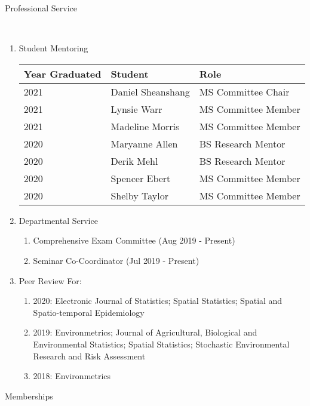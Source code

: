 \documentclass[12pt]{article}
\newcommand{\head}[1]{ %
    \bigskip %
    \begin{large}\begin{bf}{#1}\end{bf}\end{large} %

    \ \\ [-1.3cm] %

    \hrulefill}
\begin{document}
\head{Professional Service}
\begin{enumerate}[label=$\bullet$]

\item Student Mentoring

\begin{table}[H]
\centering
\begin{tabular}{lll}
  \hline
Year Graduated & Student & Role \\ 
  \hline
2021  & Daniel Sheanshang & MS Committee Chair  \\ 
2021  & Lynsie Warr & MS Committee Member  \\ 
2021  & Madeline Morris & MS Committee Member  \\ 
2020  & Maryanne Allen & BS Research Mentor  \\ 
2020  & Derik Mehl & BS Research Mentor \\ 
2020  & Spencer Ebert & MS Committee Member  \\ 
2020  & Shelby Taylor & MS Committee Member  \\ 
   \hline
\end{tabular}
\end{table}

\item Departmental Service
\begin{enumerate}[label=$\cdot$]
\item Comprehensive Exam Committee (Aug 2019 - Present)
\item Seminar Co-Coordinator (Jul 2019 - Present)
\end{enumerate}

\item Peer Review For:
\begin{enumerate}[label=$\cdot$]
\item 2020: Electronic Journal of Statistics; Spatial Statistics; Spatial and Spatio-temporal Epidemiology
\item 2019: Environmetrics; Journal of Agricultural, Biological and Environmental Statistics; Spatial Statistics; Stochastic Environmental Research and Risk Assessment 
\item 2018: Environmetrics 
\end{enumerate}
\end{enumerate}


\head{Memberships}
\end{document}
